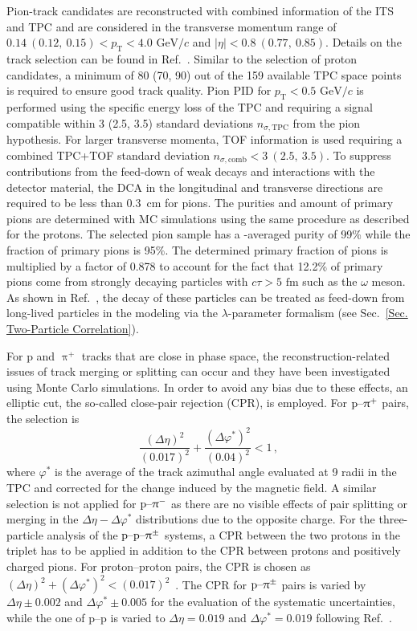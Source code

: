 \documentclass[ALICE,manyauthors]{cernphprep}
\begin{document}
Pion-track candidates are reconstructed with combined information of the ITS and TPC and are considered in the transverse momentum range of $0.14~(0.12,~0.15) < p_\text{T} < 4.0  \text{ GeV}/c$ and $|\eta| < 0.8~(0.77,~0.85)$. Details on the track selection can be found in Ref.~\cite{ALICE:2023sjd}. Similar to the selection of proton candidates, a minimum of 80 (70, 90) out of the 159 available TPC space points is required to ensure good track quality. Pion PID for $p_\text{T} < 0.5 \text{ GeV}/c$ is performed using the specific energy loss of the TPC and requiring a signal compatible within 3 (2.5, 3.5) standard deviations $n_{\sigma,\text{TPC}}$ from the pion hypothesis. For larger transverse momenta, TOF information is used requiring a combined TPC+TOF standard deviation $n_{\sigma, \text{comb}} < 3~(2.5,~3.5)$. To suppress contributions from the feed-down of weak decays and interactions with the detector material, the DCA in the longitudinal and transverse directions are required to be less than 0.3~cm for pions. The purities and amount of primary pions are determined with MC simulations using the same procedure as described for the protons. The selected pion sample has a \ptText-averaged purity of 99\% while the fraction of primary pions is 95\%. The determined primary fraction of pions is multiplied by a factor of 0.878 to account for the fact that 12.2\% of primary pions come from strongly decaying particles with  $c\tau>5\text{ fm}$ such as the $\omega$ meson. As shown in Ref.~\cite{ALICE:2023sjd}, the decay of these particles can be treated as feed-down from long-lived particles in the modeling via the $\lambda$-parameter formalism (see Sec.~\ref{Sec. Two-Particle Correlation}).

For p and $\uppi^+$ tracks that are close in phase space, the reconstruction-related issues of track merging or splitting can occur and they have been investigated using Monte Carlo simulations. In order to avoid any bias due to these effects, an elliptic cut, the so-called close-pair rejection (CPR), is employed. For $\text{p--}\uppi^+$ pairs, the selection is
\begin{equation}
    \frac{(\Delta \eta)^2}{(0.017)^2} + \frac{(\Delta \varphi^*)^2}{(0.04)^2} < 1 \,, \label{Eq. CPR PPion}
\end{equation}
where $\varphi^{*}$ is the average of the track azimuthal angle evaluated at 9 radii in the TPC and corrected for the change induced by the magnetic field.  A similar selection is
 not applied for $\text{p--}\uppi^-$ as there are no visible effects of pair splitting or merging in the $\Delta \eta-\Delta\varphi^*$ distributions due to the opposite charge.  For the three-particle analysis of the $\text{p--p--}\uppi^\pm$ systems, a CPR between the two protons in the triplet has to be applied in addition to the CPR between protons and positively charged pions. For proton--proton pairs, the CPR is chosen as ${(\Delta \eta)^2 + (\Delta \varphi^*)^2 < (0.017)^2}$~\cite{ALICE:ppp-ppL}. The CPR for $\text{p--}\uppi^\pm$ pairs is varied by $\Delta\eta \pm 0.002$ and $\Delta\varphi^* \pm 0.005$ for the evaluation of the systematic uncertainties, while the one of p--p is varied to $\Delta\eta = 0.019$ and $\Delta\varphi^* = 0.019$ following Ref.~\cite{ALICE:ppp-ppL}.
\end{document}
